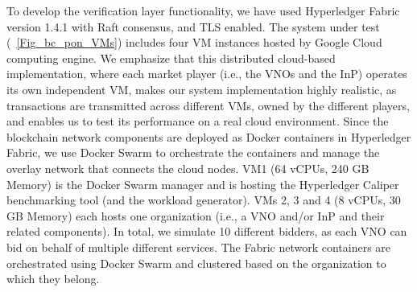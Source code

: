 To develop the verification layer functionality, we have used Hyperledger Fabric version 1.4.1 with Raft consensus, and \ac{TLS} enabled. The system under test (\figureautorefname~\ref{Fig_bc_pon_VMs}) includes four \ac{VM} instances hosted by Google Cloud computing engine. We emphasize that this distributed cloud-based implementation, where each market player (i.e., the \acp{VNO} and the \ac{InP}) operates its own independent \ac{VM}, makes our system implementation highly realistic, as transactions are transmitted across different \acp{VM}, owned by the different players, and enables us to test its performance on a real cloud environment. Since the blockchain network components are deployed as Docker containers in Hyperledger Fabric, we use Docker Swarm to orchestrate the containers and manage the overlay network that connects the cloud nodes.
VM1 (64 \acp{vCPU}, 240 GB Memory) is the Docker Swarm manager and is hosting the Hyperledger Caliper benchmarking tool (and the workload generator). \acp{VM} 2, 3 and 4 (8 \acp{vCPU}, 30 GB Memory) each hosts one organization (i.e., a \ac{VNO} and/or \ac{InP} and their related components). In total, we simulate 10 different bidders, as each \ac{VNO} can bid on behalf of multiple different services. The Fabric network containers are orchestrated using Docker Swarm and clustered based on the organization to which they belong. 


